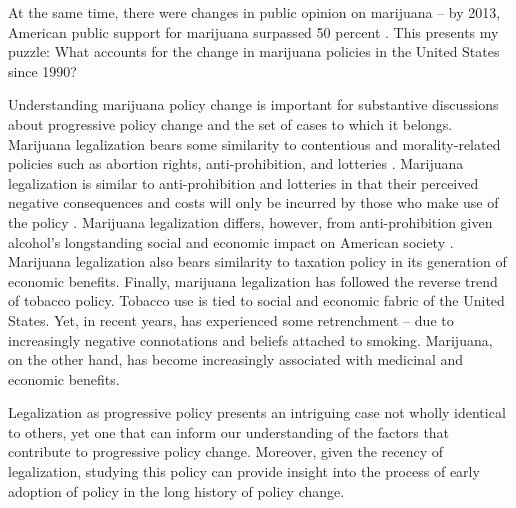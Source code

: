 At the same time, there were changes in public opinion on marijuana -- by 2013, American public support for marijuana surpassed 50 percent \citep{gallup_2013}. This presents my puzzle: What accounts for the change in marijuana policies in the United States since 1990? 

Understanding marijuana policy change is important for substantive discussions about progressive policy change and the set of cases to which it belongs. Marijuana legalization bears some similarity to contentious and morality-related policies such as abortion rights, anti-prohibition, and lotteries \citep{gusfield_1963,andrews_and_seguin_2015,pierce_and_miller_1999,berry_and_berry_1990}. Marijuana legalization is similar to anti-prohibition and lotteries in that their perceived negative consequences and costs will only be incurred by those who make use of the policy \citep{mikesell_and_zorn_1986,berry_and_berry_1990}. Marijuana legalization differs, however, from anti-prohibition given alcohol's longstanding social and economic impact on American society \citep{andrews_and_seguin_2015}. Marijuana legalization also bears similarity to taxation policy \citep{amenta_and_halfmann_2000} in its generation of economic benefits. Finally, marijuana legalization has followed the reverse trend of tobacco policy. Tobacco use is tied to social and economic fabric of the United States. Yet, in recent years, has experienced some retrenchment --  due to increasingly negative connotations and beliefs attached to smoking. Marijuana, on the other hand, has become increasingly associated with medicinal and economic benefits. 

Legalization as progressive policy presents an intriguing case not wholly identical to others, yet one that can inform our understanding of the factors that contribute to progressive policy change. Moreover, given the recency of legalization, studying this policy can provide insight into the process of early adoption of policy in the long history of policy change. 


